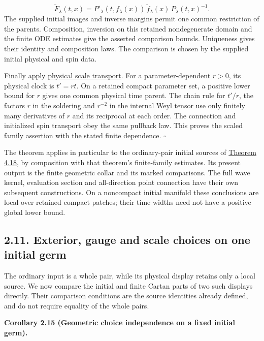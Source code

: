 \documentclass[
  english,
  11pt,
  reqno]{amsart}
\makeatletter
\newcommand{\pandocstatementheading}[1]{%
  \par\addpenalty{\@beginparpenalty}%
  \addvspace{.5\baselineskip plus .2\baselineskip minus .2\baselineskip}%
  {\normalfont\bfseries #1\par}%
  \nobreak\@afterindenttrue\@afterheading
}
\makeatother
\begin{document}
\label{eq:online-collar-comparison-spin-family} \[
\widetilde F_\lambda(t,x)
=P'_\lambda(t,f_\lambda(x))\,
\widetilde f_\lambda(x)\,
P_\lambda(t,x)^{-1}.
\] The supplied initial images and inverse margins permit one common
restriction of the parents. Composition, inversion on this retained
nondegenerate domain and the finite ODE estimates give the asserted
comparison bounds. Uniqueness gives their identity and composition laws.
The comparison is chosen by the supplied initial physical and spin data.

Finally apply \hyperref[prop:online-cartan-physical-scale]{physical
scale transport}. For a parameter-dependent \(r>0\), its physical clock
is \(t'=rt\). On a retained compact parameter set, a positive lower
bound for \(r\) gives one common physical time parent. The chain rule
for \(t'/r\), the factors \(r\) in the soldering and \(r^{-2}\) in the
internal Weyl tensor use only finitely many derivatives of \(r\) and its
reciprocal at each order. The connection and initialized spin transport
obey the same pullback law. This proves the scaled family assertion with
the stated finite dependence. \hfill\(\square\)

The theorem applies in particular to the ordinary-pair initial sources
of
\hyperref[thm:online-ordinary-negative-response-initial-source]{Theorem
4.18}, by composition with that theorem's finite-family estimates. Its
present output is the finite geometric collar and its marked
comparisons. The full wave kernel, evaluation section and all-direction
point connection have their own subsequent constructions. On a
noncompact initial manifold these conclusions are local over retained
compact patches; their time widths need not have a positive global lower
bound.

\subsection{2.11. Exterior, gauge and scale choices on one initial
germ}\label{exterior-gauge-and-scale-choices-on-one-initial-germ}\label{sec:online-fixed-slice-geometric-choices}

The ordinary input is a whole pair, while its physical display retains
only a local source. We now compare the initial and finite Cartan parts
of two such displays directly. Their comparison conditions are the
source identities already defined, and do not require equality of the
whole pairs.

\pandocstatementheading{\leavevmode{}\label{cor:online-fixed-slice-geometric-choice-independence}Corollary 2.15 (Geometric choice independence on a fixed initial germ).}
\end{document}
